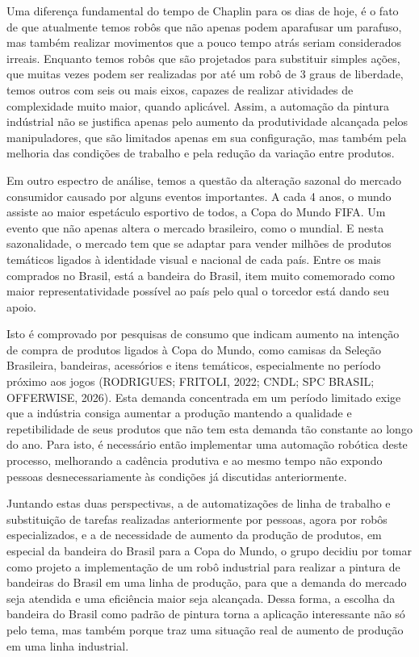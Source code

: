 Uma diferença fundamental do tempo de Chaplin para os dias de hoje, é o fato de que atualmente temos robôs que não apenas podem aparafusar um parafuso, mas também realizar movimentos que a pouco tempo atrás seriam considerados irreais. Enquanto temos robôs que são projetados para substituir simples ações, que muitas vezes podem ser realizadas por até um robô de 3 graus de liberdade, temos outros com seis ou mais eixos, capazes de realizar atividades de complexidade muito maior, quando aplicável. Assim, a automação da pintura indústrial não se justifica apenas pelo aumento da produtividade alcançada pelos manipuladores, que são limitados apenas em sua configuração, mas também pela melhoria das condições de trabalho e pela redução da variação entre produtos.

Em outro espectro de análise, temos a questão da alteração sazonal do mercado consumidor causado por alguns eventos importantes. A cada 4 anos, o mundo assiste ao maior espetáculo esportivo de todos, a Copa do Mundo FIFA. Um evento que não apenas altera o mercado brasileiro, como o mundial. E nesta sazonalidade, o mercado tem que se adaptar para vender milhões de produtos temáticos ligados à identidade visual e nacional de cada país. Entre os mais comprados no Brasil, está a bandeira do Brasil, item muito comemorado como maior representatividade possível ao país pelo qual o torcedor está dando seu apoio. 

Isto é comprovado por pesquisas de consumo que indicam aumento na intenção de compra de produtos ligados à Copa do Mundo, como camisas da Seleção Brasileira, bandeiras, acessórios e itens temáticos, especialmente no período próximo aos jogos (RODRIGUES; FRITOLI, 2022; CNDL; SPC BRASIL; OFFERWISE, 2026). Esta demanda concentrada em um período limitado exige que a indústria consiga aumentar a produção mantendo a qualidade e repetibilidade de seus produtos que não tem esta demanda tão constante ao longo do ano. Para isto, é necessário então implementar uma automação robótica deste processo, melhorando a cadência produtiva e ao mesmo tempo não expondo pessoas desnecessariamente às condições já discutidas anteriormente.

Juntando estas duas perspectivas, a de automatizações de linha de trabalho e substituição de tarefas realizadas anteriormente por pessoas, agora por robôs especializados, e a de necessidade de aumento da produção de produtos, em especial da bandeira do Brasil para a Copa do Mundo, o grupo decidiu por tomar como projeto a implementação de um robô industrial para realizar a pintura de bandeiras do Brasil em uma linha de produção, para que a demanda do mercado seja atendida e uma eficiência maior seja alcançada. Dessa forma, a escolha da bandeira do Brasil como padrão de pintura torna a aplicação interessante não só pelo tema, mas também porque traz uma situação real de aumento de produção em uma linha industrial.

